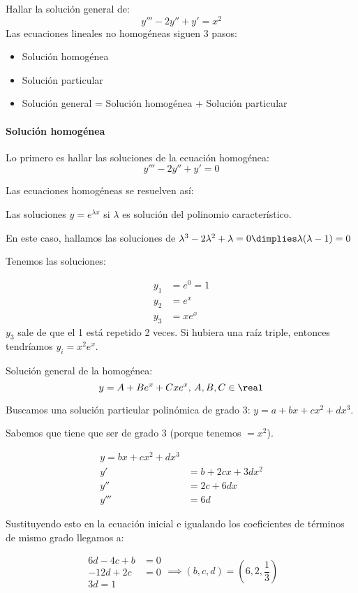 \documentclass[nochap]{apuntes}
\begin{document}
\begin{problem}[9]
Hallar la solución general de:
\[y'''-2y''+y' = x^2\]
\solution
Las ecuaciones lineales no homogéneas siguen 3 pasos:

\begin{itemize}
\item Solución homogénea
\item Solución particular
\item Solución general = Solución homogénea + Solución particular
\end{itemize}

\paragraph{Solución homogénea}
Lo primero es hallar las soluciones de la ecuación homogénea:
\[y'''-2y''+y' = 0\]

Las ecuaciones homogéneas se resuelven así:

Las soluciones $y=e^{\lambda x}$ si $\lambda$ es solución del polinomio característico.

En este caso, hallamos las soluciones de $\lambda^3 - 2\lambda^2 + \lambda = 0 \dimplies \lambda(\lambda-1) = 0$

Tenemos las soluciones: 

\[\begin{array}{cc}
y_1 &= e^0 = 1\\
y_2 &= e^x\\
y_3 &= xe^x
\end{array}
\]
$y_3$ sale de que el 1 está repetido 2 veces. Si hubiera una raíz triple, entonces tendríamos $y_i = x^2e^x$.

Solución general de la homogénea:
\[y=A+Be^x+Cxe^x,\,A,B,C\in\real\]

Buscamos una solución particular polinómica de grado 3: $y=a+bx+cx^2+dx^3$.

Sabemos que tiene que ser de grado 3 (porque tenemos $=x^2$).

\[\begin{array}{cc}
y = bx+cx^2+dx^3\\
y' &= b+2cx+3dx^2\\
y'' &= 2c + 6dx\\
y''' &= 6d
\end{array}\]

Sustituyendo esto en la ecuación inicial e igualando los coeficientes de términos de mismo grado llegamos a:

\[\begin{array}{cc}
6d-4c+b&=0\\
-12d + 2c &= 0\\
3d=1\end{array} \implies (b,c,d) = \left(6,2,\frac{1}{3}\right)\]


\end{problem}
\end{document}
